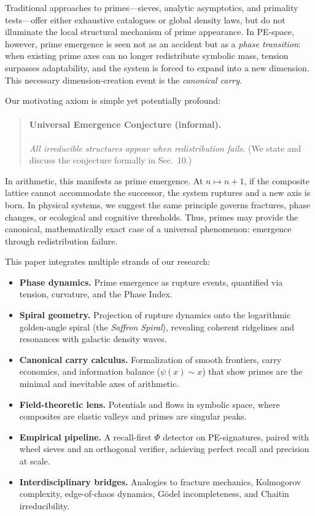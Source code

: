 \documentclass[11pt]{article}
\theoremstyle{plain}
\theoremstyle{definition}
\begin{document}
Traditional approaches to primes—sieves, analytic asymptotics, and primality tests—offer either exhaustive catalogues or global density laws, but do not illuminate the local structural mechanism of prime appearance. In PE-space, however, prime emergence is seen not as an accident but as a \emph{phase transition}: when existing prime axes can no longer redistribute symbolic mass, tension surpasses adaptability, and the system is forced to expand into a new dimension. This necessary dimension-creation event is the \emph{canonical carry}.

Our motivating axiom is simple yet potentially profound:

\begin{quote}
\paragraph{Universal Emergence Conjecture (informal).}
\emph{All irreducible structures appear when redistribution fails.}
(We state and discuss the conjecture formally in Sec.~10.)
\end{quote}

In arithmetic, this manifests as prime emergence. At $n \mapsto n+1$, if the composite lattice cannot accommodate the successor, the system ruptures and a new axis is born. In physical systems, we suggest the same principle governs fractures, phase changes, or ecological and cognitive thresholds. Thus, primes may provide the canonical, mathematically exact case of a universal phenomenon: emergence through redistribution failure.

This paper integrates multiple strands of our research:
\begin{itemize}
  \item \textbf{Phase dynamics.} Prime emergence as rupture events, quantified via tension, curvature, and the Phase Index.
  \item \textbf{Spiral geometry.} Projection of rupture dynamics onto the logarithmic golden-angle spiral (the \emph{Saffron Spiral}), revealing coherent ridgelines and resonances with galactic density waves.
  \item \textbf{Canonical carry calculus.} Formalization of smooth frontiers, carry economics, and information balance ($\psi(x) \sim x$) that show primes are the minimal and inevitable axes of arithmetic.
  \item \textbf{Field-theoretic lens.} Potentials and flows in symbolic space, where composites are elastic valleys and primes are singular peaks.
  \item \textbf{Empirical pipeline.} A recall-first $\Phi$ detector on PE-signatures, paired with wheel sieves and an orthogonal verifier, achieving perfect recall and precision at scale.
  \item \textbf{Interdisciplinary bridges.} Analogies to fracture mechanics, Kolmogorov complexity, edge-of-chaos dynamics, Gödel incompleteness, and Chaitin irreducibility.
\end{itemize}
\end{document}
